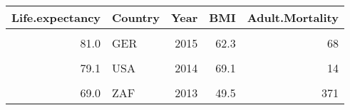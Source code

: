 \begin{table}
\centering
\begin{tabular}[t]{rlrrr}
\toprule
\textbf{Life.expectancy} & \textbf{Country} & \textbf{Year} & \textbf{BMI} & \textbf{Adult.Mortality}\\
\midrule
\cellcolor{gray!6}{53.2} & \cellcolor{gray!6}{ETH} & \cellcolor{gray!6}{2002} & \cellcolor{gray!6}{12.9} & \cellcolor{gray!6}{369}\\
81.0 & GER & 2015 & 62.3 & 68\\
\cellcolor{gray!6}{76.8} & \cellcolor{gray!6}{USA} & \cellcolor{gray!6}{2000} & \cellcolor{gray!6}{6.1} & \cellcolor{gray!6}{114}\\
79.1 & USA & 2014 & 69.1 & 14\\
\cellcolor{gray!6}{58.9} & \cellcolor{gray!6}{ZAF} & \cellcolor{gray!6}{2011} & \cellcolor{gray!6}{47.9} & \cellcolor{gray!6}{413}\\
69.0 & ZAF & 2013 & 49.5 & 371\\
\bottomrule
\end{tabular}
\end{table}
